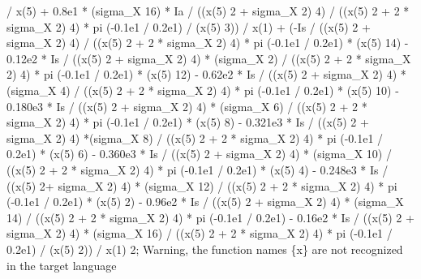 \begin{maplegroup}
/ x(5) + 0.8e1 * (sigma\_X  16) * Ia / ((x(5)  2 + sigma\_X  2)  4) / ((x(5)  2 + 2 * sigma\_X  2)  4) * pi  (-0.1e1 / 0.2e1) / (x(5)  3)) / x(1) + (-Is / ((x(5)  2 + sigma\_X  2)  4) / ((x(5)  2 + 2 * sigma\_X 2)  4) * pi  (-0.1e1 / 0.2e1) * (x(5)  14) - 0.12e2 * Is / ((x(5)  2 + sigma\_X  2)  4) * (sigma\_X  2) / ((x(5)  2 + 2 * sigma\_X  2)  4) * pi  (-0.1e1 / 0.2e1) * (x(5)  12) - 0.62e2 * Is / ((x(5)  2 + sigma\_X  2)  4) * (sigma\_X  4) / ((x(5)  2 + 2 * sigma\_X  2)  4) * pi  (-0.1e1 / 0.2e1) * (x(5)  10) - 0.180e3 * Is / ((x(5)  2 + sigma\_X  2)  4) * (sigma\_X  6) / ((x(5)  2 + 2 * sigma\_X  2)  4) * pi  (-0.1e1 / 0.2e1) * (x(5)  8) - 0.321e3 * Is / ((x(5)  2 + sigma\_X  2)  4) *(sigma\_X  8) / ((x(5)  2 + 2 * sigma\_X  2)  4) * pi  (-0.1e1 / 0.2e1) * (x(5)  6) - 0.360e3 * Is / ((x(5)  2 + sigma\_X  2)  4) * (sigma\_X  10) / ((x(5)  2 + 2 * sigma\_X  2)  4) * pi  (-0.1e1 / 0.2e1) * (x(5)  4) - 0.248e3 * Is / ((x(5)  2+ sigma\_X  2)  4) * (sigma\_X  12) / ((x(5)  2 + 2 * sigma\_X  2)  4) * pi  (-0.1e1 / 0.2e1) * (x(5)  2) - 0.96e2 * Is / ((x(5)  2 + sigma\_X  2)  4) * (sigma\_X  14) / ((x(5)  2 + 2 * sigma\_X  2)  4) * pi  (-0.1e1 / 0.2e1) - 0.16e2 * Is / ((x(5)  2 + sigma\_X  2)  4) * (sigma\_X  16) / ((x(5)  2 + 2 * sigma\_X  2)  4) * pi  (-0.1e1 / 0.2e1) / (x(5)  2)) / x(1)  2;
\underline{}Warning, the function names \{x\} are not recognized in the target language\underline{}\mapleresult

\end{maplegroup}
